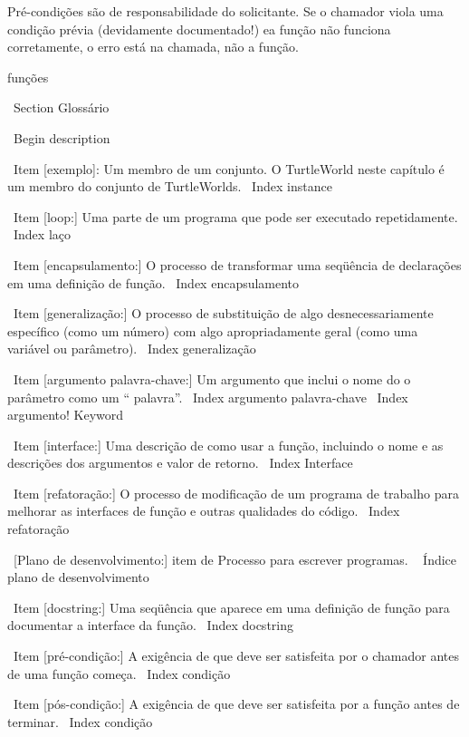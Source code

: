 \documentclass[10pt]{book}
\begin{document}
\begin {itemize}
{Pré-condições são de responsabilidade do solicitante. Se o chamador
viola uma condição prévia (devidamente documentado!) ea função
não funciona corretamente, o erro está na chamada, não a função.

funções%


\ Section {} Glossário

\ Begin {description}

\ Item [exemplo]: Um membro de um conjunto. O TurtleWorld neste
capítulo é um membro do conjunto de TurtleWorlds.
\ Index {instance}

\ Item [loop:] Uma parte de um programa que pode ser executado repetidamente.
\ Index {laço}

\ Item [encapsulamento:] O processo de transformar uma seqüência de
declarações em uma definição de função.
\ Index {} encapsulamento

\ Item [generalização:] O processo de substituição de algo
desnecessariamente específico (como um número) com algo apropriadamente
geral (como uma variável ou parâmetro).
\ Index {generalização}

\ Item [argumento palavra-chave:] Um argumento que inclui o nome do
o parâmetro como um `` palavra''.
\ Index {argumento palavra-chave}
\ Index {argumento! Keyword}

\ Item [interface:] Uma descrição de como usar a função, incluindo
o nome e as descrições dos argumentos e valor de retorno.
\ Index {Interface}

\ Item [refatoração:] O processo de modificação de um programa de trabalho para
  melhorar as interfaces de função e outras qualidades do código.
\ Index {} refatoração

\ [Plano de desenvolvimento:] item de Processo para escrever programas.
\ {} Índice plano de desenvolvimento

\ Item [docstring:] Uma seqüência que aparece em uma definição de função
para documentar a interface da função.
\ Index {} docstring

\ Item [pré-condição:] A exigência de que deve ser satisfeita por
o chamador antes de uma função começa.
\ Index {condição}

\ Item [pós-condição:] A exigência de que deve ser satisfeita por
a função antes de terminar.
\ Index {condição}

}
\end{itemize}
\end{document}
